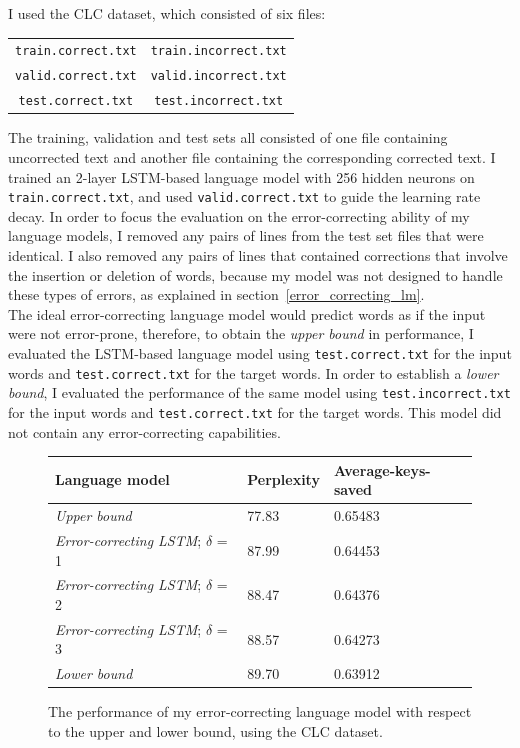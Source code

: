\documentclass[a4paper, 12pt]{report}
\newcommand{\tbf}[1]{\textbf{#1}}
\newcommand{\ttt}[1]{\texttt{#1}}
\newcommand{\tit}[1]{\textit{#1}}
\begin{document}
I used the CLC dataset, which consisted of six files:
\begin{center}
\begin{tabular}{c c}
	\ttt{train.correct.txt} & \ttt{train.incorrect.txt} \\
	\ttt{valid.correct.txt} & \ttt{valid.incorrect.txt} \\
	\ttt{test.correct.txt} & \ttt{test.incorrect.txt}
\end{tabular}
\end{center}
The training, validation and test sets all consisted of one file containing uncorrected text and another file containing the corresponding corrected text. I trained an 2-layer LSTM-based language model with 256 hidden neurons on \ttt{train.correct.txt}, and used \ttt{valid.correct.txt} to guide the learning rate decay. In order to focus the evaluation on the error-correcting ability of my language models, I removed any pairs of lines from the test set files that were identical. I also removed any pairs of lines that contained corrections that involve the insertion or deletion of words, because my model was not designed to handle these types of errors, as explained in section~\ref{error_correcting_lm}. \\

The ideal error-correcting language model would predict words as if the input were not error-prone, therefore, to obtain the \tit{upper bound} in performance, I evaluated the LSTM-based language model using \ttt{test.correct.txt} for the input words and \ttt{test.correct.txt} for the target words. In order to establish a \tit{lower bound}, I evaluated the performance of the same model using \ttt{test.incorrect.txt} for the input words and \ttt{test.correct.txt} for the target words. This model did not contain any error-correcting capabilities. \\

\begin{figure}[h]
\captionsetup{justification=centering}
\begin{adjustbox}{center}
\begin{tabular}{| L{6cm} | C{3cm} | C{5cm} |}
	\hline
	\tbf{Language model} & \tbf{Perplexity} & \tbf{Average-keys-saved} \\ \hline
	\tit{Upper bound} & 77.83 & 0.65483 \\ \hline
	\tit{Error-correcting LSTM}; $\delta$ = 1 & 87.99 & 0.64453 \\ \hline
	\tit{Error-correcting LSTM}; $\delta$ = 2 & 88.47 & 0.64376 \\ \hline
	\tit{Error-correcting LSTM}; $\delta$ = 3 & 88.57 & 0.64273 \\ \hline
	\tit{Lower bound} & 89.70 & 0.63912 \\ \hline
\end{tabular}
\end{adjustbox}
\caption{The performance of my error-correcting language model with respect to the upper and lower bound, using the CLC dataset.}
\label{fig:error_correcting_results}
\end{figure}
\end{document}
